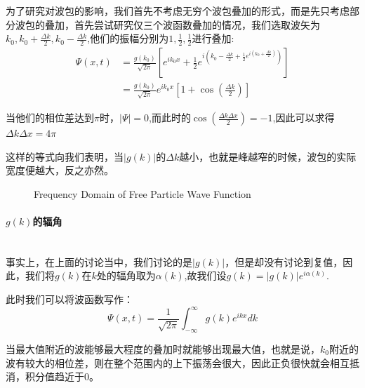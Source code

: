 \documentclass{article}
\begin{document}
为了研究对波包的影响，我们首先不考虑无穷个波包叠加的形式，而是先只考虑部分波包的叠加，首先尝试研究仅三个波函数叠加的情况，我们选取波矢为$\displaystyle k_0,k_0+\frac{\Delta k}{2},k_0-\frac{\Delta k}{2}$,他们的振幅分别为$1,\frac{1}{2},\frac{1}{2}$进行叠加:
\begin{align*}
	\Psi(x,t) & =\frac{g(k_0)}{\sqrt{2\pi}}\left[e^{ik_0x}+\frac{1}{2}e^{i(k_0-\frac{\Delta k}{2}+\frac{1}{2}e^{i(k_0+\frac{\Delta k}{2})})}\right] \\
	          & =\frac{g(k_0)}{\sqrt{2\pi}}e^{ik_0x}\left[1+\cos(\frac{\Delta k}{2})\right]
\end{align*}

当他们的相位差达到$\pi$时，$|\Psi|=0$,而此时的$\cos(\frac{\Delta k\Delta x}{2})=-1$,因此可以求得$\Delta k\Delta x=4\pi$

这样的等式向我们表明，当$|g(k)|$的$\Delta k$越小，也就是峰越窄的时候，波包的实际宽度便越大，反之亦然。







\begin{figure}[hbtp]
	\centering
	\caption{Frequency Domain of Free Particle Wave Function}
	\label{fig:frequency-domain}
\end{figure}




\paragraph{$g(k)$的辐角}\ \\
事实上，在上面的讨论当中，我们讨论的是$|g(k)|$，但是却没有讨论到复值，因此，我们将$g(k)$在$k$处的辐角取为$\alpha(k)$,故我们设$g(k)=|g(k)|e^{i\alpha(k)}$.

此时我们可以将波函数写作：
\[
	\Psi(x,t)=\frac{1}{\sqrt{2\pi}}\int_{-\infty}^{\infty}g(k)e^{ikx}dk
\]

当最大值附近的波能够最大程度的叠加时就能够出现最大值，也就是说，$k_0$附近的波有较大的相位差，则在整个范围内的上下振荡会很大，因此正负很快就会相互抵消，积分值趋近于$0$。
\end{document}
